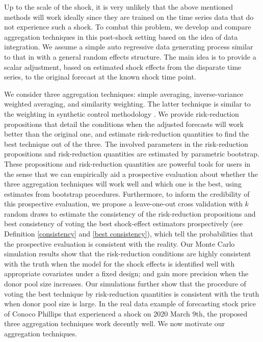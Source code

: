 \documentclass[11pt]{article}
\theoremstyle{definition}
\begin{document}

Up to the scale of the shock, it is very unlikely that the above mentioned methods will work ideally since they are trained on the time series data that do not experience such a shock. To combat this problem, we develop and compare aggregation techniques in this post-shock setting based on the idea of data integration. We assume a simple auto regressive data generating process similar to that in \citet{blundell1998initial} with a general random effects structure. The main idea is to provide a scalar adjustment, based on estimated shock effects from the disparate time series, to the original forecast at the known shock time point. 

We consider three aggregation techniques: simple averaging, inverse-variance weighted averaging, and similarity weighting. The latter technique is similar to the weighting in synthetic control methodology \citep{abadie2010synthetic}. We provide risk-reduction propositions that detail the conditions  when the adjusted forecasts will work better than the original one, and estimate risk-reduction quantities to find the best technique out of the three. The involved parameters in the risk-reduction propositions and risk-reduction quantities are estimated by parametric bootstrap. These propositions and risk-reduction quantities are powerful tools for users in the sense that we can empirically aid a prospective evaluation about whether the three aggregation techniques  will work well and which one is the best, using estimates from bootstrap procedures. Furthermore, to inform the credibility of this prospective evaluation, we propose a leave-one-out cross validation with $k$ random draws to estimate the consistency of the risk-reduction propositions and best consistency of voting the best shock-effect estimators prospectively (see Definition \ref{consistency} and \ref{best consistency}), which tell the probabilities that the prospective evaluation is consistent with the reality. Our Monte Carlo simulation results show that  the risk-reduction conditions are highly consistent with the truth when the model for the shock effects is identified well with appropriate covariates under a fixed design; and gain more precision when the donor pool size increases. Our simulations further show that the procedure of voting the best technique by risk-reduction quantities is consistent with the truth when donor pool size is large. In the real data example of forecasting stock price of Conoco Phillips that experienced a shock on 2020 March 9th, the proposed three aggregation techniques work decently well. We now motivate our aggregation techniques.
\end{document}
